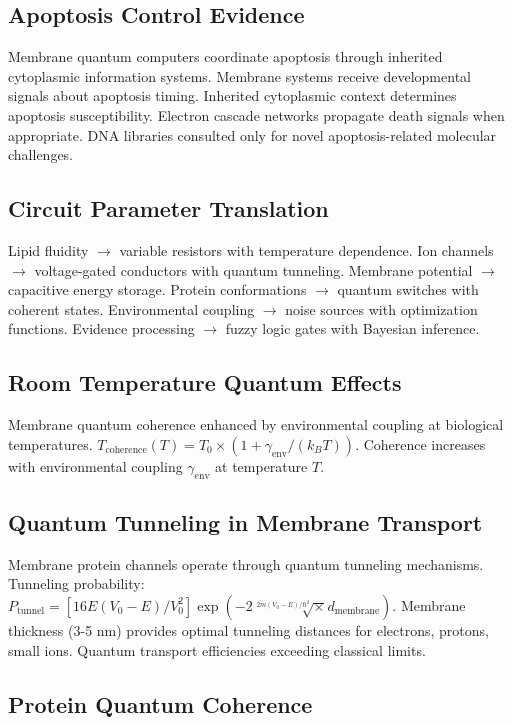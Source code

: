 \documentclass[12pt,a4paper]{article}
\begin{document}
\subsection{Apoptosis Control Evidence}

Membrane quantum computers coordinate apoptosis through inherited cytoplasmic information systems. Membrane systems receive developmental signals about apoptosis timing. Inherited cytoplasmic context determines apoptosis susceptibility. Electron cascade networks propagate death signals when appropriate. DNA libraries consulted only for novel apoptosis-related molecular challenges.

\subsection{Circuit Parameter Translation}

Lipid fluidity $\to$ variable resistors with temperature dependence. Ion channels $\to$ voltage-gated conductors with quantum tunneling. Membrane potential $\to$ capacitive energy storage. Protein conformations $\to$ quantum switches with coherent states. Environmental coupling $\to$ noise sources with optimization functions. Evidence processing $\to$ fuzzy logic gates with Bayesian inference.

\subsection{Room Temperature Quantum Effects}

Membrane quantum coherence enhanced by environmental coupling at biological temperatures. $T_{\text{coherence}}(T) = T_0 \times (1 + \gamma_{\text{env}}/(k_BT))$. Coherence increases with environmental coupling $\gamma_{\text{env}}$ at temperature $T$.

\subsection{Quantum Tunneling in Membrane Transport}

Membrane protein channels operate through quantum tunneling mechanisms. Tunneling probability: $P_{\text{tunnel}} = [16E(V_0 - E)/V_0^2] \exp(-2\sqrt[2m(V_0 - E)/\hbar^2] \times d_{\text{membrane}})$. Membrane thickness (3-5 nm) provides optimal tunneling distances for electrons, protons, small ions. Quantum transport efficiencies exceeding classical limits.

\subsection{Protein Quantum Coherence}
\end{document}
